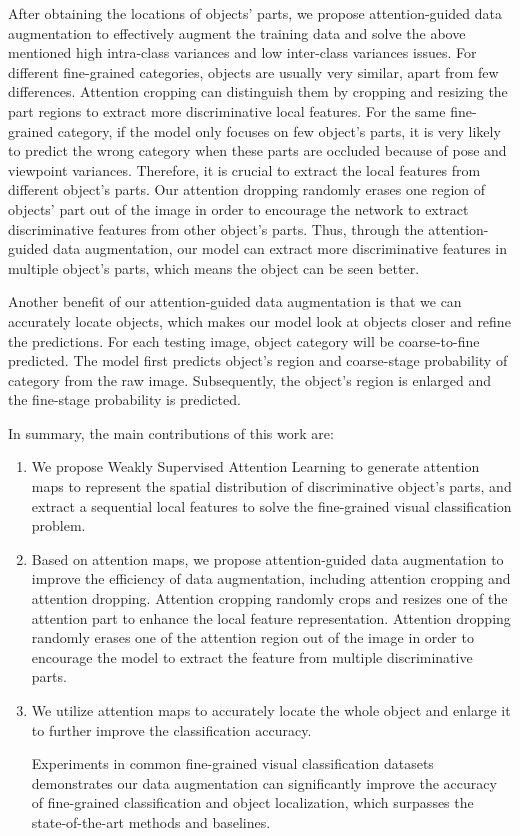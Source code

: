 \documentclass[10pt,twocolumn,letterpaper]{article}
\begin{document}
After obtaining the locations of objects' parts, we propose attention-guided data augmentation to effectively augment the training data and solve the above mentioned high intra-class variances and low inter-class variances issues. For different fine-grained categories, objects are usually very similar, apart from few differences. Attention cropping can distinguish them by cropping and resizing the part regions to extract more discriminative local features. For the same fine-grained category, if the model only focuses on few object's parts, it is very likely to predict the wrong category when these parts are occluded because of pose and viewpoint variances. Therefore, it is crucial to extract the local features from different object's parts. Our attention dropping randomly erases one region of objects' part out of the image in order to encourage the network to extract discriminative features from other object's parts. Thus, through the attention-guided data augmentation, our model can extract more discriminative features in multiple object's parts, which means the object can be seen better.

Another benefit of our attention-guided data augmentation is that we can accurately locate objects, which makes our model look at objects closer and refine the predictions. For each testing image, object category will be coarse-to-fine predicted. The model first predicts object's region and coarse-stage probability of category from the raw image. Subsequently, the object's region is enlarged and the fine-stage probability is predicted.

In summary, the main contributions of this work are:
\begin{enumerate}
    \item We propose Weakly Supervised Attention Learning to generate attention maps to represent the spatial distribution of discriminative object's parts, and extract a sequential local features to solve the fine-grained visual classification problem.
    \item Based on attention maps, we propose attention-guided data augmentation to improve the efficiency of data augmentation, including attention cropping and attention dropping. Attention cropping randomly crops and resizes one of the attention part to enhance the local feature representation. Attention dropping randomly erases one of the attention region out of the image in order to encourage the model to extract the feature from multiple discriminative parts.
    \item We utilize attention maps to accurately locate the whole object and enlarge it to further improve the classification accuracy.

    Experiments in common fine-grained visual classification datasets demonstrates our data augmentation can significantly improve the accuracy of fine-grained classification and object localization, which surpasses the state-of-the-art methods and baselines.
\end{enumerate}
\end{document}
